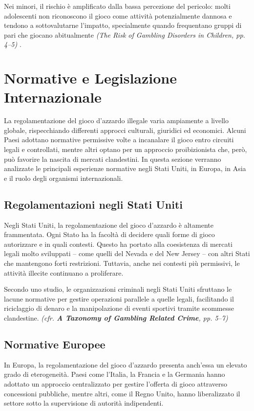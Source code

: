 \documentclass[a4paper,12pt]{article}
\begin{document}
Nei minori, il rischio è amplificato dalla bassa percezione del pericolo: molti adolescenti non riconoscono il gioco come attività potenzialmente dannosa e tendono a sottovalutarne l’impatto, specialmente quando frequentano gruppi di pari che giocano abitualmente \textit{(The Risk of Gambling Disorders in Children, pp. 4--5)} \cite{ferrara2019childrenrisk}.


\section{Normative e Legislazione Internazionale}

La regolamentazione del gioco d’azzardo illegale varia ampiamente a livello globale, rispecchiando differenti approcci culturali, giuridici ed economici. Alcuni Paesi adottano normative permissive volte a incanalare il gioco entro circuiti legali e controllati, mentre altri optano per un approccio proibizionista che, però, può favorire la nascita di mercati clandestini. In questa sezione verranno analizzate le principali esperienze normative negli Stati Uniti, in Europa, in Asia e il ruolo degli organismi internazionali.

\subsection{Regolamentazioni negli Stati Uniti}

Negli Stati Uniti, la regolamentazione del gioco d’azzardo è altamente frammentata. Ogni Stato ha la facoltà di decidere quali forme di gioco autorizzare e in quali contesti. Questo ha portato alla coesistenza di mercati legali molto sviluppati – come quelli del Nevada e del New Jersey – con altri Stati che mantengono forti restrizioni. Tuttavia, anche nei contesti più permissivi, le attività illecite continuano a proliferare.

Secondo uno studio, le organizzazioni criminali negli Stati Uniti sfruttano le lacune normative per gestire operazioni parallele a quelle legali, facilitando il riciclaggio di denaro e la manipolazione di eventi sportivi tramite scommesse clandestine. \textit{(cfr. \textbf{A Taxonomy of Gambling Related Crime}, pp. 5--7)} \cite{banks2018taxonomy}

\subsection{Normative Europee}

In Europa, la regolamentazione del gioco d’azzardo presenta anch’essa un elevato grado di eterogeneità. Paesi come l’Italia, la Francia e la Germania hanno adottato un approccio centralizzato per gestire l’offerta di gioco attraverso concessioni pubbliche, mentre altri, come il Regno Unito, hanno liberalizzato il settore sotto la supervisione di autorità indipendenti.
\end{document}
